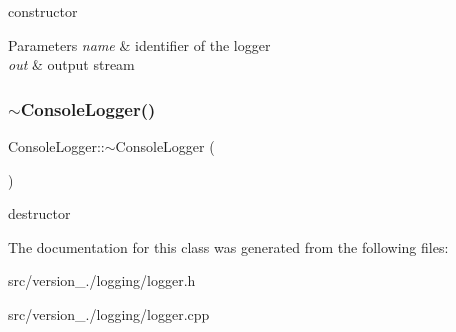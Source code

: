 constructor 
\begin{DoxyParams}{Parameters}
{\em name} & identifier of the logger \\
\hline
{\em out} & output stream \\
\hline
\end{DoxyParams}
\mbox{\label{classez_1_1logging_1_1ConsoleLogger_a242e88aa9495249d5a7fbdfc4f8886ee}} 
\subsubsection{\texorpdfstring{$\sim$\+Console\+Logger()}{~ConsoleLogger()}}
{\footnotesize\ttfamily Console\+Logger\+::$\sim$\+Console\+Logger (\begin{DoxyParamCaption}{ }\end{DoxyParamCaption})}

destructor 

The documentation for this class was generated from the following files\+:\begin{DoxyCompactItemize}
\item 
src/version\+\_./logging/logger.\+h\item 
src/version\+\_./logging/logger.\+cpp\end{DoxyCompactItemize}
